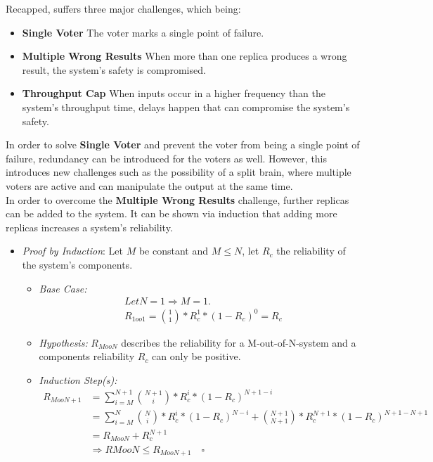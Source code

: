 Recapped,  suffers three major challenges, which being:

\newcommand{\ChallengeWR}{\textbf{Multiple Wrong Results}\xspace}
\newcommand{\ChallengeVoter}{\textbf{Single Voter}\xspace}
\newcommand{\ChallengeThrough}{\textbf{Throughput Cap}\xspace}
\begin{itemize}
\item \ChallengeVoter The voter marks a single point of failure.
\item \ChallengeWR When more than one replica produces a wrong result, the system's safety is compromised.
\item \ChallengeThrough When inputs occur in a higher frequency than the system's throughput time, delays happen that can compromise the system's safety.
\end{itemize}

In order to solve \ChallengeVoter and prevent the voter from being a single point of failure, redundancy can be introduced for the voters as well.
However, this introduces new challenges such as the possibility of a split brain, where multiple voters are active and can manipulate the output at the same time.
\\

In order to overcome the \ChallengeWR challenge, further replicas can be added to the system.
It can be shown via induction that adding more replicas increases a system's reliability.

\begin{itemize}
\item \emph{Proof by Induction}: Let $M$ be constant and $M \leq N$, let $R_{c}$ the reliability of the system's components.
\begin{itemize}[label=$\lozenge$, itemsep=2ex]
\item \emph{Base Case:}
\begin{align*}
&Let N = 1 \Rightarrow M = 1.\\
&R_{1oo1} = {1 \choose 1} * R_{c}^1 * (1 - R_{c})^0 = R_{c}
\end{align*}

\item \emph{Hypothesis:} $R_{MooN}$ describes the reliability for a M-out-of-N-system and a components reliability $R_{c}$ can only be positive.

\item \emph{Induction Step(s):}
\begin{align*}
R_{MooN+1} &= \sum_{i=M}^{N+1} {N + 1 \choose i} * R_{c}^i * (1 - R_c)^{N + 1 - i}\\
&= \sum_{i=M}^{N} {N \choose i} * R_{c}^i * (1 - R_c)^{N - i} + {N+1 \choose N+1} * R_c^{N+1} * (1 - R_c)^{N+1 - N+1}\\
&= R_{MooN} + R_c^{N+1} \\
&\Rightarrow R{MooN} \leq R_{MooN+1} \quad \square
\end{align*}
\end{itemize}
\end{itemize}


